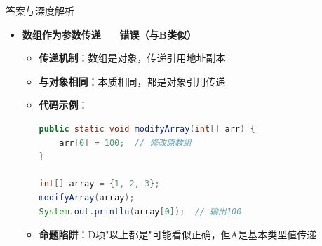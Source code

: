 \documentclass[12pt, a4paper]{ctexart}
\begin{document}
\begin{enumerate}[label=\textbf{\arabic*.}]
\begin{bluebox}{答案与深度解析}
\begin{itemize}[leftmargin=*, nosep, label={}]
\begin{itemize}[label={}, leftmargin=*, nosep]
\begin{lstlisting}[language=Java]
public class ReferencePassDemo {
    // 对象作为参数传递（引用地址传递）
    public static void changeName(Person p, String newName) {
        // p是引用地址的副本
        // 通过引用访问堆中的对象
        p.name = newName;  // 修改原始对象的属性
    }

    // 重新赋值引用副本
    public static void changeReference(Person p) {
        p = new Person("新对象");  // 修改副本引用，不影响原引用
    }

    public static void main(String[] args) {
        Person person = new Person("张三");
        System.out.println("改变前: " + person.name);  // 张三

        changeName(person, "李四");
        System.out.println("改变属性后: " + person.name);  // 李四

        Person original = person;
        changeReference(person);
        System.out.println("改变引用后: " + person.name);  // 李四（原引用不变）
        System.out.println("same object: " + (person == original));  // true
    }
}
				            \end{lstlisting}
			            \end{itemize}

			      \item[C] \textbf{数组作为参数传递 — 错误（与B类似）}
			            \begin{itemize}[label={}, leftmargin=*, nosep]
				            \item \textbf{传递机制}：数组是对象，传递引用地址副本
				            \item \textbf{与对象相同}：本质相同，都是对象引用传递
				            \item \textbf{代码示例}：
				                  \begin{lstlisting}[language=Java]
public static void modifyArray(int[] arr) {
    arr[0] = 100;  // 修改原数组
}

int[] array = {1, 2, 3};
modifyArray(array);
System.out.println(array[0]);  // 输出100
				            \end{lstlisting}
				            \item \textbf{命题陷阱}：D项"以上都是"可能看似正确，但A是基本类型值传递
			            \end{itemize}


\end{itemize}
\end{bluebox}
\end{enumerate}
\end{document}
